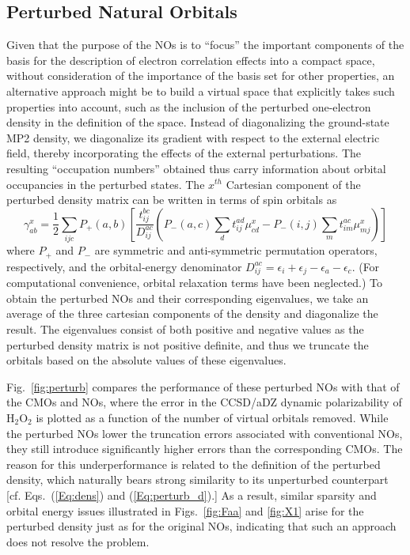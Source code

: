 \subsection{Perturbed Natural Orbitals}

Given that the purpose of the NOs is to ``focus'' the important components of
the basis for the description of electron correlation effects into a compact
space, without consideration of the importance of the basis set for other
properties, an alternative approach might be to build a virtual space that
explicitly takes such properties into account, such as the inclusion of the
perturbed one-electron density in the definition of the space.  Instead of
diagonalizing the ground-state MP2 density, we diagonalize its gradient with
respect to the external electric field, thereby incorporating the effects of
the external perturbations.  The resulting ``occupation numbers'' obtained
thus carry information about orbital occupancies in the perturbed states.  The
$x^{th}$ Cartesian component of the perturbed density matrix can be written in
terms of spin orbitals as
\begin{equation}
\gamma^x_{ab} = \frac{1}{2}\sum_{ijc}P_{+}(a,b)\left[\frac{t^{bc}_{ij}}{D^{ac}_{ij}}\left(P_{-}(a,c)\sum_dt^{ad}_{ij}\mu^x_{cd} - P_{-}(i,j)\sum_m t^{ac}_{im}\mu^x_{mj}\right)\right]
\label{Eq:perturb_d}
\end{equation}
where $P_{+}$ and $P_{-}$ are symmetric and anti-symmetric permutation
operators, respectively, and the orbital-energy denominator $D^{ac}_{ij} =
\epsilon_i + \epsilon_j  -\epsilon_a -\epsilon_c $.  (For computational
convenience, orbital relaxation terms have been neglected.) To obtain the
perturbed NOs and their corresponding eigenvalues, we take an average of the
three cartesian components of the density and diagonalize the result.
The eigenvalues consist of both positive and negative values as the perturbed
density matrix is not positive definite, and thus we truncate the orbitals
based on the absolute values of these eigenvalues.

Fig.~\ref{fig:perturb} compares the performance of these perturbed NOs with
that of the CMOs and NOs, where the error in the CCSD/aDZ dynamic
polarizability of H$_2$O$_2$ is plotted as a function of the number of virtual
orbitals removed. While the perturbed NOs lower the truncation errors
associated with conventional NOs, they still introduce significantly higher
errors than the corresponding CMOs.  The reason for this underperformance is
related to the definition of the perturbed density, which naturally bears
strong similarity to its unperturbed counterpart [cf. Eqs.~(\ref{Eq:dens}) and
(\ref{Eq:perturb_d}).]  As a result, similar sparsity and orbital energy issues
illustrated in Figs.~\ref{fig:Faa} and \ref{fig:X1} arise for the perturbed
density just as for the original NOs, indicating that such an approach does not
resolve the problem.

